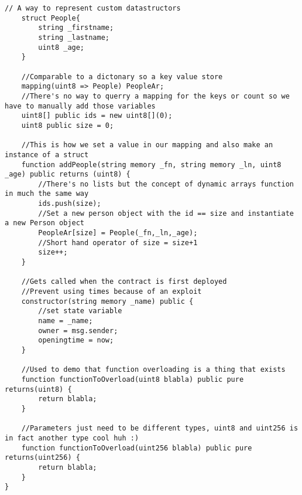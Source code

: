 \begin{lstlisting}[language=Solidity]
    // A way to represent custom datastructors
    struct People{
        string _firstname;
        string _lastname;
        uint8 _age;
    }

    //Comparable to a dictonary so a key value store
    mapping(uint8 => People) PeopleAr;
    //There's no way to querry a mapping for the keys or count so we have to manually add those variables
    uint8[] public ids = new uint8[](0);
    uint8 public size = 0;

    //This is how we set a value in our mapping and also make an instance of a struct
    function addPeople(string memory _fn, string memory _ln, uint8 _age) public returns (uint8) {
        //There's no lists but the concept of dynamic arrays function in much the same way
        ids.push(size);
        //Set a new person object with the id == size and instantiate a new Person object
        PeopleAr[size] = People(_fn,_ln,_age);
        //Short hand operator of size = size+1
        size++;
    }

    //Gets called when the contract is first deployed
    //Prevent using times because of an exploit
    constructor(string memory _name) public {
        //set state variable
        name = _name;
        owner = msg.sender;
        openingtime = now;
    }

    //Used to demo that function overloading is a thing that exists
    function functionToOverload(uint8 blabla) public pure returns(uint8) {
        return blabla;
    }

    //Parameters just need to be different types, uint8 and uint256 is in fact another type cool huh :)
    function functionToOverload(uint256 blabla) public pure returns(uint256) {
        return blabla;
    }
}
\end{lstlisting}
